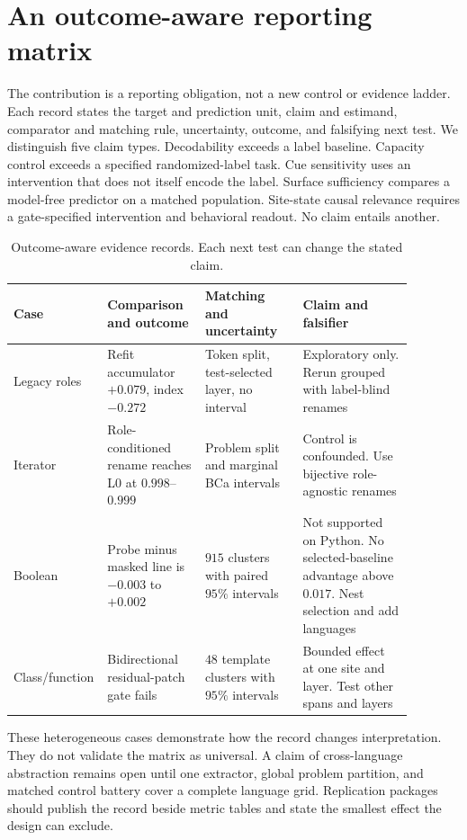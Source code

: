 \documentclass{article}
\begin{document}
\section{An outcome-aware reporting matrix}

The contribution is a reporting obligation, not a new control or evidence
ladder. Each record states the target and prediction unit, claim and estimand,
comparator and matching rule, uncertainty, outcome, and falsifying next test.
We distinguish five claim types. Decodability exceeds a label baseline.
Capacity control exceeds a specified randomized-label task. Cue sensitivity
uses an intervention that does not itself encode the label. Surface
sufficiency compares a model-free predictor on a matched population.
Site-state causal relevance requires a gate-specified intervention and
behavioral readout. No claim entails another.

\begin{table}[t]
\centering
\small
\setlength{\tabcolsep}{3pt}
\caption{Outcome-aware evidence records. Each next test can change the stated
claim.}
\label{tab:controls}
\begin{tabular}{L{0.13\linewidth}L{0.24\linewidth}L{0.24\linewidth}L{0.27\linewidth}}
\toprule
Case & Comparison and outcome & Matching and uncertainty & Claim and falsifier \\
\midrule
Legacy roles &
Refit accumulator $+0.079$, index $-0.272$ &
Token split, test-selected layer, no interval &
Exploratory only. Rerun grouped with label-blind renames \\
Iterator &
Role-conditioned rename reaches L0 at $0.998$--$0.999$ &
Problem split and marginal BCa intervals &
Control is confounded. Use bijective role-agnostic renames \\
Boolean &
Probe minus masked line is $-0.003$ to $+0.002$ &
$915$ clusters with paired $95\%$ intervals &
Not supported on Python. No selected-baseline advantage above $0.017$. Nest selection and add languages \\
Class/function &
Bidirectional residual-patch gate fails &
$48$ template clusters with $95\%$ intervals &
Bounded effect at one site and layer. Test other spans and layers \\
\bottomrule
\end{tabular}
\end{table}

These heterogeneous cases demonstrate how the record changes interpretation.
They do not validate the matrix as universal. A claim of cross-language
abstraction remains open until one extractor, global problem partition, and
matched control battery cover a complete language grid. Replication packages
should publish the record beside metric tables and state the smallest effect
the design can exclude.
\end{document}
